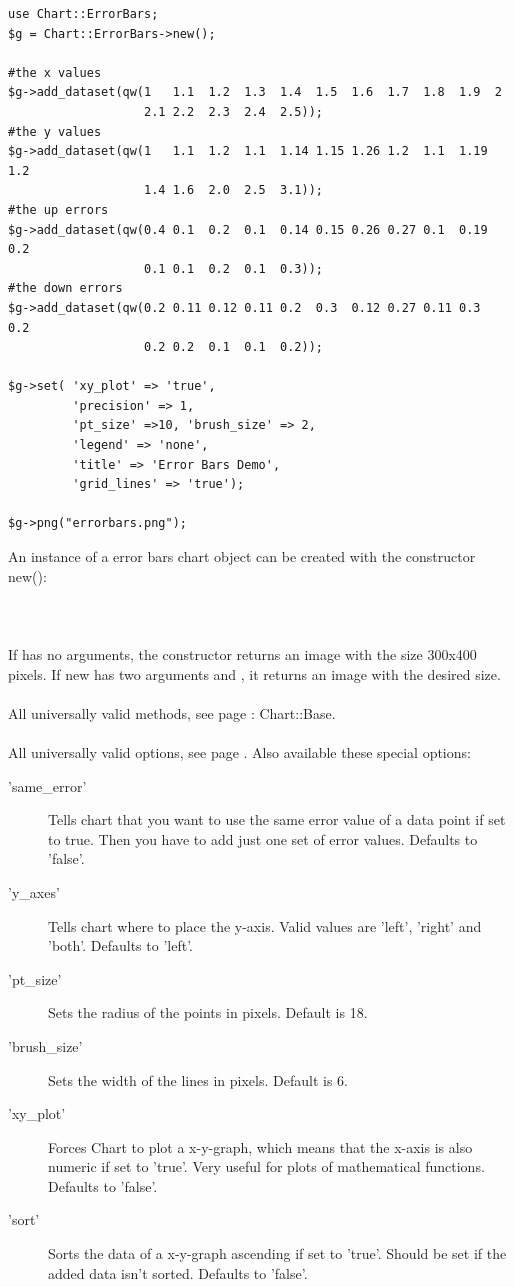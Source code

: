 \begin{verbatim}
use Chart::ErrorBars;
$g = Chart::ErrorBars->new();

#the x values
$g->add_dataset(qw(1   1.1  1.2  1.3  1.4  1.5  1.6  1.7  1.8  1.9  2
                   2.1 2.2  2.3  2.4  2.5));
#the y values
$g->add_dataset(qw(1   1.1  1.2  1.1  1.14 1.15 1.26 1.2  1.1  1.19 1.2
                   1.4 1.6  2.0  2.5  3.1));
#the up errors
$g->add_dataset(qw(0.4 0.1  0.2  0.1  0.14 0.15 0.26 0.27 0.1  0.19 0.2
                   0.1 0.1  0.2  0.1  0.3));
#the down errors
$g->add_dataset(qw(0.2 0.11 0.12 0.11 0.2  0.3  0.12 0.27 0.11 0.3  0.2
                   0.2 0.2  0.1  0.1  0.2));
                   
$g->set( 'xy_plot' => 'true',
         'precision' => 1,
         'pt_size' =>10, 'brush_size' => 2,
         'legend' => 'none',
         'title' => 'Error Bars Demo',
         'grid_lines' => 'true');

$g->png("errorbars.png");
\end{verbatim}
 An instance of a error bars chart object can be created with the constructor new():\\
\\
\\
\\
If  has no arguments, the constructor returns an image with the size 300x400 pixels. If new has two arguments  and , it returns an image with the desired size. \\ 
\\ 
All universally valid methods, see page \pageref{methods}: Chart::Base. \\
\\
 All universally valid options, see page \pageref{options}. Also available these special options:
\begin{description}
\item['same\_error'] Tells chart that you want to use the same error value of a data point if set to true. Then you have to add just one set of error values. Defaults to 'false'.
\item['y\_axes'] Tells chart where to place the y-axis. Valid values are 'left', 'right' and 'both'. Defaults to 'left'.
\item['pt\_size']Sets the radius of the points in pixels. Default is 18.
\item['brush\_size']Sets the width of the lines in pixels. Default is 6.
\item['xy\_plot']Forces Chart to plot a x-y-graph, which means that the x-axis is also numeric if set to 'true'. Very useful for plots of mathematical functions. Defaults to 'false'.
\item['sort']Sorts the data of a x-y-graph ascending if set to 'true'. Should be set if the added data isn't sorted. Defaults to 'false'. 
\end{description}